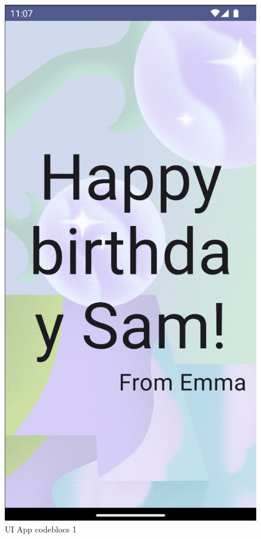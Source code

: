 \documentclass{scrartcl}
\begin{document}
         \begin{figure}
            \centerline{\includegraphics[scale=0.4]{birthday}}
            \caption{UI App codeblocs 1}
            \label{fig:birthday}
         \end{figure}
\end{document}
